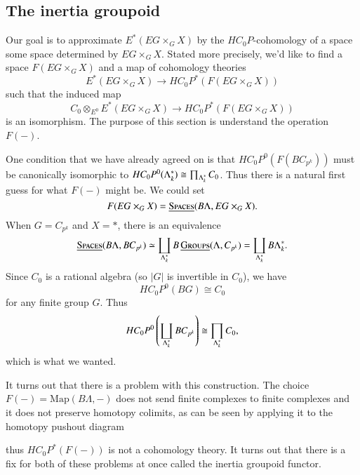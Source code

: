 \subsection*{The inertia groupoid}

Our goal is to approximate $E^*(EG \times_G X)$ by the $HC_0P$-cohomology of a space some space determined by $EG \times_G X$. Stated more precisely, we'd like to find a space $F(EG \times_G X)$ and a map of cohomology theories
\[
E^*(EG \times_G X) \to HC_0P^*(F(EG \times_G X))
\]
such that the induced map
\[
C_0 \otimes_{E^0} E^*(EG \times_G X) \to HC_0P^*(F(EG \times_G X))
\]
is an isomorphism. The purpose of this section is understand the operation $F(-)$. 

One condition that we have already agreed on is that $HC_0P^0(F(BC_{p^k}))$ must be canonically isomorphic to 
$HC_0P^0(\Lambda_k^*) \cong \prod_{\Lambda_k^*}C_0$. Thus there is a natural first guess for what $F(-)$ might be. We could set 
\[
F(EG \times_G X) = \operatorname{\underline{\smash{\normalfont\textsc{Spaces}}}}(B\Lambda, EG \times_G X).
\]
When $G = C_{p^k}$ and $X = *$, there is an equivalence
\[
\operatorname{\underline{\smash{\normalfont\textsc{Spaces}}}}(B\Lambda, BC_{p^k}) \simeq \coprod_{\Lambda_k^*} B\operatorname{\underline{\smash{\normalfont\textsc{Groups}}}}(\Lambda,C_{p^k}) = \coprod_{\Lambda_k^*} B\Lambda_k^*.
\]
Since $C_0$ is a rational algebra (so $|G|$ is invertible in $C_0$), we have 
\[
HC_0P^0(BG) \cong C_0
\]
for any finite group $G$. Thus
\[
HC_0P^0\left(\coprod_{\Lambda_k^*} BC_{p^k}\right) \cong \prod_{\Lambda_k^*}C_0,
\]
which is what we wanted.

It turns out that there is a problem with this construction. The choice $F(-) = \mathrm{Map}(B\Lambda,-)$ does not send finite complexes to finite complexes and it does not preserve homotopy colimits, as can be seen by applying it to the homotopy pushout diagram
\begin{center}
\end{center}
thus $HC_0P^*(F(-))$ is not a cohomology theory. It turns out that there is a fix for both of these problems at once called the inertia groupoid functor. 

%


